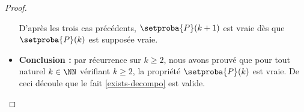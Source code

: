 \begin{proof}
\begin{itemize}[label=\small\textbullet]
		\medskip
		\noindent
		D'après les trois cas précédents, $\setproba{P}(k + 1)$ est vraie dès que $\setproba{P}(k)$ est supposée vraie.


		\medskip
		\item \textbf{Conclusion :} par récurrence sur $k \geq 2$, nous avons prouvé que pour tout naturel $k \in \NN$ vérifiant $k \geq 2$, la propriété $\setproba{P}(k)$ est vraie.
		De ceci découle que le fait \ref{exists-decompo} est valide.
	\end{itemize}
\end{proof}
